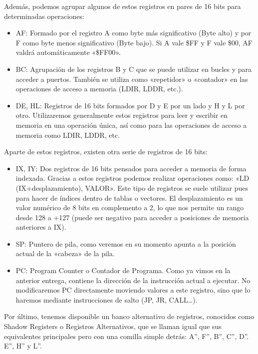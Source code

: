 \documentclass[letterpaper,10pt,spanish]{sphinxmanual}
\begin{document}
Además, podemos agrupar algunos de estos registros en pares de 16 bits para determinadas operaciones:
\begin{itemize}
\item {} 
AF: Formado por el registro A como byte más significativo (Byte alto) y por F como byte menos significativo (Byte bajo). Si A vale \$FF y F vale \$00, AF valdrá automáticamente «\$FF00».

\item {} 
BC: Agrupación de los registros B y C que se puede utilizar en bucles y para acceder a puertos. También se utiliza como «repetidor» o «contador» en las operaciones de acceso a memoria (LDIR, LDDR, etc.).

\item {} 
DE, HL: Registros de 16 bits formados por D y E por un lado y H y L por otro. Utilizaremos generalmente estos registros para leer y escribir en memoria en una operación única, así como para las operaciones de acceso a memoria como LDIR, LDDR, etc.

\end{itemize}

Aparte de estos registros, existen otra serie de registros de 16 bits:
\begin{itemize}
\item {} 
IX, IY: Dos registros de 16 bits pensados para acceder a memoria de forma indexada. Gracias a estos registros podemos realizar operaciones como: «LD (IX+desplazamiento), VALOR». Este tipo de registros se suele utilizar pues para hacer de índices dentro de tablas o vectores. El desplazamiento es un valor numérico de 8 bits en complemento a 2, lo que nos permite un rango desde \sphinxhyphen{}128 a +127 (puede ser negativo para acceder a posiciones de memoria anteriores a IX).

\item {} 
SP: Puntero de pila, como veremos en su momento apunta a la posición actual de la «cabeza» de la pila.

\item {} 
PC: Program Counter o Contador de Programa. Como ya vimos en la anterior entrega, contiene la dirección de la instrucción actual a ejecutar. No modificaremos PC directamente moviendo valores a este registro, sino que lo haremos mediante instrucciones de salto (JP, JR, CALL…).

\end{itemize}

Por último, tenemos disponible un banco alternativo de registros, conocidos como Shadow Registers o Registros Alternativos, que se llaman igual que sus equivalentes principales pero con una comilla simple detrás: A”, F”, B”, C”, D”. E”, H” y L”.
\end{document}
